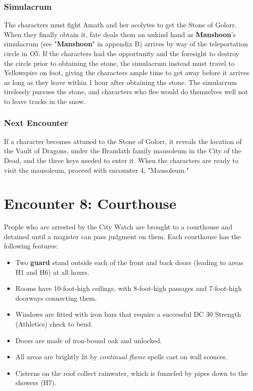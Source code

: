 \documentclass[10pt,a4paper,twoside,twocolumn,openany,nodeprecatedcode]{dndbook}
\begin{document}
\subsubsection{Simulacrum}
The characters must fight Amath and her acolytes to get the Stone of Golorr. When they finally obtain it, fate deals them an unkind hand as \textbf{Manshoon}'s simulacrum (see "\textbf{Manshoon}" in appendix B) arrives by way of the teleportation circle in O5. If the characters had the opportunity and the foresight to destroy the circle prior to obtaining the stone, the simulacrum instead must travel to Yellowspire on foot, giving the characters ample time to get away before it arrives as long as they leave within 1 hour after obtaining the stone. The simulacrum tirelessly pursues the stone, and characters who flee would do themselves well not to leave tracks in the snow.
\subsubsection{Next Encounter}
If a character becomes attuned to the Stone of Golorr, it reveals the location of the Vault of Dragons, under the Brandath family mausoleum in the City of the Dead, and the three keys needed to enter it. When the characters are ready to visit the mausoleum, proceed with encounter 4, "Mausoleum."
\section{Encounter 8: Courthouse}
People who are arrested by the City Watch are brought to a courthouse and detained until a magister can pass judgment on them. Each courthouse has the following features:
\begin{itemize}

\item Two \textbf{guard} stand outside each of the front and back doors (leading to areas H1 and H6) at all hours.
\item Rooms have 10-foot-high ceilings, with 8-foot-high passages and 7-foot-high doorways connecting them.
\item Windows are fitted with iron bars that require a successful DC 30 Strength (Athletics) check to bend.
\item Doors are made of iron-bound oak and unlocked.
\item All areas are brightly lit by \textit{continual flame} spells cast on wall sconces.
\item Cisterns on the roof collect rainwater, which is funneled by pipes down to the showers (H7).
\end{itemize}
\end{document}
